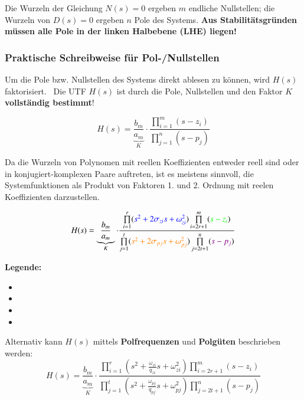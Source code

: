 Die Wurzeln der Gleichung $N(s) = 0$ ergeben $m$ endliche Nullstellen; die Wurzeln von $D(s) = 0$ ergeben $n$ Pole des Systems.
\textbf{Aus Stabilitätsgründen müssen alle Pole in der linken Halbebene (LHE) liegen!}


\subsubsection{Praktische Schreibweise für Pol-/Nullstellen}

Um die Pole bzw. Nullstellen des Systems direkt ablesen zu können, wird $H(s)$ faktorisiert. \textrightarrow\ Die UTF $H(s)$ ist durch
die Pole, Nullstellen und den Faktor $K$ \textbf{vollständig bestimmt}!

$$ H(s) = \underbrace{\frac{b_m}{a_m}}_{K} \cdot \frac{\prod\limits_{i=1}^m (s - z_i)}{\prod\limits_{j=1}^n (s - p_j)} $$


Da die Wurzeln von Polynomen mit reellen Koeffizienten entweder reell sind oder in konjugiert-komplexen Paare auftreten, ist es meistens
sinnvoll, die Systemfunktionen als Produkt von Faktoren 1. und 2. Ordnung mit reelen Koeffizienten darzustellen.

$$ H(s) = \underbrace{\frac{b_m}{a_m}}_{K} \cdot 
    \frac{\prod\limits_{i=1}^r ({\color{blue}s^2 + 2 \sigma_{zi} s + \omega_{zi}^2}) \prod\limits_{i=2r+1}^m ({\color{green}s - z_i})}
    {\prod\limits_{j=1}^t ({\color{orange}s^2 + 2 \sigma_{pj} s + \omega_{pj}^2}) \prod\limits_{j=2t+1}^n ({\color{violet}s - p_j})} $$

\textbf{Legende:}
\begin{itemize}
    \item {} 
    \item {}
    \item {} 
    \item {} 
\end{itemize}

\vspace{0.2cm}

Alternativ kann $H(s)$ mittels \textbf{Polfrequenzen} und \textbf{Polgüten} beschrieben werden:
$$ H(s) = \underbrace{\frac{b_m}{a_m}}_{K} \cdot 
    \frac{\prod\limits_{i=1}^r (s^2 + \frac{\omega_{zi}}{q_{zi}} s + \omega_{zi}^2) \prod\limits_{i=2r+1}^m (s - z_i)}
    {\prod\limits_{j=1}^t (s^2 +\frac{\omega_{pj}}{q_{pj}} s + \omega_{pj}^2) \prod\limits_{j=2t+1}^n (s - p_j)} $$

